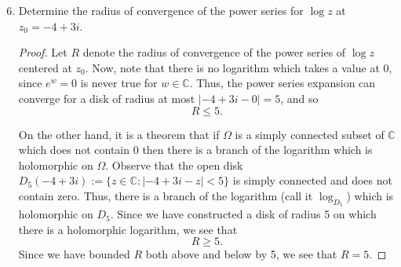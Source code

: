 \documentclass{article}
\begin{document}
\begin{enumerate}
	\setcounter{enumi}{5}
	\item Determine the radius of convergence of the power series for $\log z$ at $z_0 = -4 + 3i$.
	
	\begin{proof}
		Let $R$ denote the radius of convergence of the power series of $\log z$ centered at $z_0$.
		Now, note that there is no logarithm which takes a value at $0$, since $e^w = 0$ is never true for $w \in \mathbb{C}$.
		Thus, the power series expansion can converge for a disk of radius at most $|-4+3i - 0| = 5$, and so 
		\[ R \leq 5.\]
		
		On the other hand, it is a theorem that if $\Omega$ is a simply connected subset of 
		$\mathbb{C}$ which does not contain $0$ then there is a branch of the logarithm which is holomorphic on $\Omega$. Observe that the open disk $D_{5}(-4+3i) := \{ z \in \mathbb{C} : |-4+3i - z | < 5\}$ is simply connected and does not contain zero. Thus, there is a branch of the logarithm (call it $\log_{D_5}$) which is holomorphic on $D_5$. Since we have constructed a disk of radius 5 on which there is a holomorphic logarithm, we see that 
		\[ R \geq 5.\]
		Since we have bounded $R$ both above and below by 5, we see that $R=5$.		
	\end{proof}
	
\end{enumerate}
\end{document}
